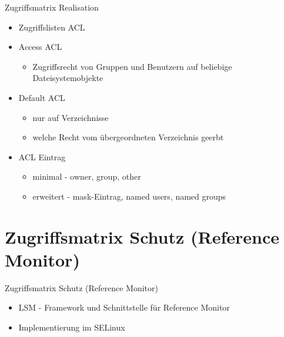 \documentclass[ucs,9pt]{beamer}
\begin{document}
\begin{frame}{Zugriffsmatrix Realisation}
\begin{itemize}
\item Zugriffslisten ACL
\item Access ACL
	\begin{itemize}
		\item Zugriffsrecht von Gruppen und Benutzern auf beliebige Dateisystemobjekte
	\end{itemize}
\item Default ACL
	\begin{itemize}
		\item nur auf Verzeichnisse
		\item welche Recht vom übergeordneten Verzeichnis geerbt
	\end{itemize}
\item ACL Eintrag
	\begin{itemize}
		\item minimal - owner, group, other
		\item erweitert - mask-Eintrag, named users, named groups
	\end{itemize}
\end{itemize}
\end{frame}

\section{Zugriffsmatrix Schutz (Reference Monitor)}

\begin{frame}{Zugriffsmatrix Schutz (Reference Monitor)}
\begin{itemize}
\item LSM - Framework und Schnittstelle für Reference Monitor
\item Implementierung im SELinux
\end{itemize}
\end{frame}


\end{document}
